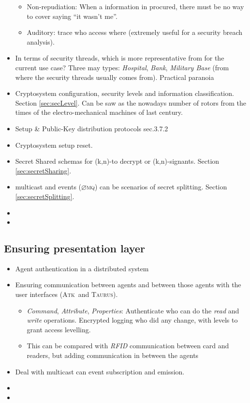 \documentclass[10pt,a4paper,twoside]{llncs}
\newcommand{\taurus}{\textsc{Taurus}}
\newcommand{\atk}{\textsc{Atk}}
\newcommand{\zmq}{\textsc{$\varnothing$mq}}
\begin{document}
\begin{itemize}
\begin{itemize}
  \item Non-repudiation: When a information in procured, there must be no way to cover saying ``it wasn't me''.
  \item Auditory: trace who access where (extremely useful for a security breach analysis).
 \end{itemize}
 \item In terms of security threads, which is more representative from \cite{SecEngRossAnderson} for the current use case? Three may types: \emph{Hospital}, \emph{Bank}, \emph{Military Base} (from where the security threads usually comes from). Practical paranoia \cite{PractCryptoSchneier}
 \item Cryptosystem configuration, security levels and information classification. Section \ref{sec:secLevel}. Can be saw as the nowadays number of rotors from the times of the electro-mechanical machines of last century.
 \item Setup \& Public-Key distribution protocols \cite{SecEngRossAnderson} sec.3.7.2
 \item Cryptosystem setup reset.
 \item Secret Shared schemas for (k,n)-to decrypt or (k,n)-signants. Section \ref{sec:secretSharing}.
 \item multicast and events (\zmq) can be scenarios of secret splitting. Section \ref{sec:secretSplitting}.
 \item 
 \item 
\end{itemize}

%
\subsection{Ensuring presentation layer \label{sec:presentationLayer}}

\begin{itemize}
 \item Agent authentication in a distributed system
 \item Ensuring communication between agents and between those agents with the user interfaces (\atk\, and \taurus).
 \begin{itemize}
  \item \emph{Command}, \emph{Attribute}, \emph{Properties}: Authenticate who can do the \emph{read} and \emph{write} operations. Encrypted logging who did any change, with levels to grant access levelling.
  \item This can be compared with \emph{RFID} communication between card and readers, but adding communication in between the agents
 \end{itemize}
 \item Deal with multicast can event subscription and emission.
 \item 
 \item 
\end{itemize}
\end{document}
